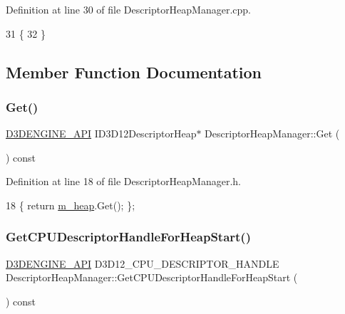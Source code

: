 Definition at line 30 of file Descriptor\+Heap\+Manager.\+cpp.


\begin{DoxyCode}
31 \{
32 \}
\end{DoxyCode}


\subsection{Member Function Documentation}
\mbox{\label{class_descriptor_heap_manager_a189cfd693db1cb7bdd5497dacd2044a3}} 
\subsubsection{\texorpdfstring{Get()}{Get()}}
{\footnotesize\ttfamily \mbox{\hyperlink{stdafx_8h_a8ee2d990c5dfba7794dd2b60741d7722}{D3\+D\+E\+N\+G\+I\+N\+E\+\_\+\+A\+PI}} I\+D3\+D12\+Descriptor\+Heap$\ast$ Descriptor\+Heap\+Manager\+::\+Get (\begin{DoxyParamCaption}{ }\end{DoxyParamCaption}) const\hspace{0.3cm}{\ttfamily [inline]}}



Definition at line 18 of file Descriptor\+Heap\+Manager.\+h.


\begin{DoxyCode}
18 \{ \textcolor{keywordflow}{return} \mbox{\hyperlink{class_descriptor_heap_manager_a373ccb68b5f147346d24469f8b46e2f4}{m\_heap}}.Get(); \};
\end{DoxyCode}
\mbox{\label{class_descriptor_heap_manager_a1d2f105a289fc558395f3546d2c018ff}} 
\subsubsection{\texorpdfstring{Get\+C\+P\+U\+Descriptor\+Handle\+For\+Heap\+Start()}{GetCPUDescriptorHandleForHeapStart()}}
{\footnotesize\ttfamily \mbox{\hyperlink{stdafx_8h_a8ee2d990c5dfba7794dd2b60741d7722}{D3\+D\+E\+N\+G\+I\+N\+E\+\_\+\+A\+PI}} D3\+D12\+\_\+\+C\+P\+U\+\_\+\+D\+E\+S\+C\+R\+I\+P\+T\+O\+R\+\_\+\+H\+A\+N\+D\+LE Descriptor\+Heap\+Manager\+::\+Get\+C\+P\+U\+Descriptor\+Handle\+For\+Heap\+Start (\begin{DoxyParamCaption}{ }\end{DoxyParamCaption}) const\hspace{0.3cm}{\ttfamily [inline]}}



